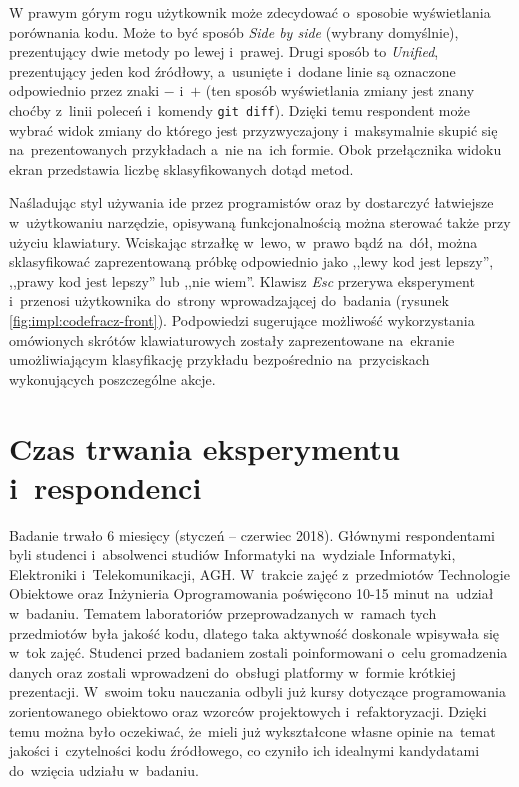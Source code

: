 \documentclass[twoside]{praca}
\begin{document}
W prawym górym rogu użytkownik może zdecydować o~sposobie wyświetlania porównania kodu. Może to być sposób \textit{Side by side} (wybrany domyślnie), prezentujący dwie metody po lewej i~prawej. Drugi sposób to \textit{Unified}, prezentujący jeden kod źródłowy, a~usunięte i~dodane linie są oznaczone odpowiednio przez znaki $-$ i~$+$ (ten sposób wyświetlania zmiany jest znany choćby z~linii poleceń i~komendy \texttt{git diff}). Dzięki temu respondent może wybrać widok zmiany do którego jest przyzwyczajony i~maksymalnie skupić się na~prezentowanych przykładach a~nie na~ich formie. Obok przełącznika widoku ekran przedstawia liczbę sklasyfikowanych dotąd metod.

Naśladując styl używania \gls{ide} przez programistów oraz by dostarczyć łatwiejsze w~użytkowaniu narzędzie, opisywaną funkcjonalnością można sterować także przy użyciu klawiatury. Wciskając strzałkę w~lewo, w~prawo bądź na~dół, można sklasyfikować zaprezentowaną próbkę odpowiednio jako ,,lewy kod jest lepszy'', ,,prawy kod jest lepszy'' lub ,,nie wiem''. Klawisz \textit{Esc} przerywa eksperyment i~przenosi użytkownika do~strony wprowadzającej do~badania (rysunek \ref{fig:impl:codefracz-front}). Podpowiedzi sugerujące możliwość wykorzystania omówionych skrótów klawiaturowych zostały zaprezentowane na~ekranie umożliwiającym klasyfikację przykładu bezpośrednio na~przyciskach wykonujących poszczególne akcje.

\section{Czas trwania eksperymentu i~respondenci}
\label{sec:impl:codefracz-respondents}

Badanie trwało 6 miesięcy (styczeń -- czerwiec 2018). Głównymi respondentami byli studenci i~absolwenci studiów Informatyki na~wydziale Informatyki, Elektroniki i~Telekomunikacji, AGH. W~trakcie zajęć z~przedmiotów Technologie Obiektowe oraz Inżynieria Oprogramowania poświęcono 10-15 minut na~udział w~badaniu. Tematem laboratoriów przeprowadzanych w~ramach tych przedmiotów była jakość kodu, dlatego taka aktywność doskonale wpisywała się w~tok zajęć. Studenci przed badaniem zostali poinformowani o~celu gromadzenia danych oraz zostali wprowadzeni do~obsługi platformy w~formie krótkiej prezentacji. W~swoim toku nauczania odbyli już kursy dotyczące programowania zorientowanego obiektowo oraz wzorców projektowych i~refaktoryzacji. Dzięki temu można było oczekiwać, że~mieli już wykształcone własne opinie na~temat jakości i~czytelności kodu źródłowego, co czyniło ich idealnymi kandydatami do~wzięcia udziału w~badaniu.
\end{document}
